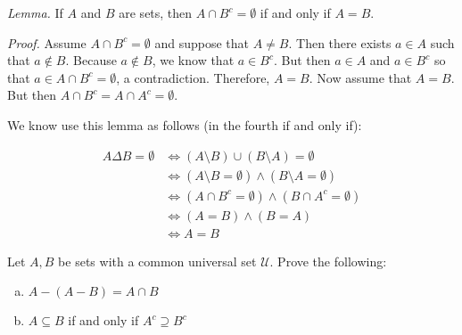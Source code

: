 \documentclass[11pt,letterpaper]{article}
\begin{document}
\begin{enumerate}[(a)]
{\noindent\itshape Lemma.} If $A$ and $B$ are sets, then $A \cap B^c= \emptyset$ if and only if $A= B$. 

{\noindent\itshape Proof.} Assume $A \cap B^c= \emptyset$ and suppose that $A \neq B$. Then there exists $a \in A$ such that $a \notin B$. Because $a \notin B$, we know that $a \in B^c$. But then $a \in A$ and $a \in B^c$ so that $a \in A \cap B^c= \emptyset$, a contradiction. Therefore, $A= B$. Now assume that $A= B$. But then $A \cap B^c= A \cap A^c= \emptyset$. 

We know use this lemma as follows (in the fourth if and only if):

	\[
	\begin{aligned}
	A \Delta B= \emptyset &\Longleftrightarrow (A \setminus B) \cup (B \setminus A)= \emptyset \\
	&\Longleftrightarrow (A \setminus B= \emptyset) \wedge (B \setminus A= \emptyset) \\
	&\Longleftrightarrow (A \cap B^c= \emptyset) \wedge (B \cap A^c= \emptyset) \\
	&\Longleftrightarrow (A= B) \wedge (B= A) \\
	&\Longleftrightarrow A= B
	\end{aligned}
	\]

\end{enumerate}





\newpage





 Let $A, B$ be sets with a common universal set $\mathscr{U}$. Prove the following:
	\begin{enumerate}[(a)]
	\item $A - (A - B)= A \cap B$
	\item $A \subseteq B$ if and only if $A^c \supseteq B^c$
	\end{enumerate} \pspace
\end{document}
